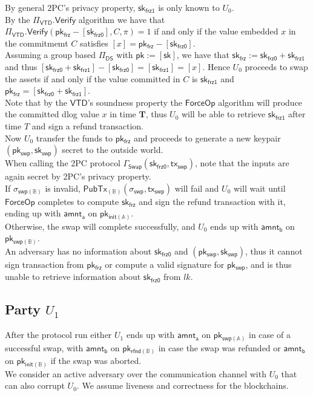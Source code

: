 \documentclass{article}      	%
\begin{document}
By general 2PC's privacy property, $\mathsf{sk_{frz1}}$ is only known to $U_0$. \\
By the $\Pi_{\mathsf{VTD}}.\mathsf{Verify}$ algorithm we have that $\Pi_{\mathsf{VTD}}.\mathsf{Verify}(\mathsf{pk_{frz}} - [\mathsf{sk_{frz0}}], C, \pi) = 1$ if and only if the value embedded $x$ in the commitmemt $C$ satisfies $[x] =  \mathsf{pk_{frz}} - [\mathsf{sk_{frz0}}]$. \\
Assuming a group based $\Pi_{\mathsf{DS}}$ with $\mathsf{pk} := [\mathsf{sk}]$, we have that $\mathsf{sk_{frz}} := \mathsf{sk_{frz0}} + \mathsf{sk_{frz1}}$ and thus $[\mathsf{sk_{frz0}} + \mathsf{sk_{frz1}}] - [\mathsf{sk_{frz0}}] = [\mathsf{sk_{frz1}}] = [x] $. Hence $U_0$ proceeds to swap the assets if and only if the value committed in $C$ is $\mathsf{sk_{frz1}}$ and $\mathsf{pk_{frz}} = [\mathsf{sk_{frz0}} + \mathsf{sk_{frz1}}]$.   \\
Note that by the $\mathsf{VTD}$'s soundness property the $\mathsf{ForceOp}$ algorithm will produce the committed dlog value $x$ in time $\textbf{T}$, thus $U_0$ will be able to retrieve  $\mathsf{sk_{frz1}}$ after time $T$ and sign a refund transaction. \\
Now $U_0$ transfer the funds to $\mathsf{pk_{frz}}$ and proceeds to generate a new keypair $(\mathsf{pk_{swp}}, \mathsf{sk_{swp}})$ secret to the outside world. \\
When calling the 2PC protocol $\Gamma_{\mathsf{Swap}}(\mathsf{sk_{frz0}}, \mathsf{tx_{swp}})$, note that the inputs are again secret by 2PC's privacy property. \\
If $\sigma_{\mathsf{swp(\mathbb{B})}}$ is invalid, $\mathsf{PubTx}_{(\mathbb{B})}(\sigma_{\mathsf{swp}}, \mathsf{tx_{swp}})$ will fail and $U_0$ will wait until $\mathsf{ForceOp}$ completes to compute $\mathsf{sk_{frz}}$ and sign the refund transaction with it, ending up with $\mathsf{amnt_a}$ on $\mathsf{pk_{init(\mathbb{A})}}$. \\
Otherwise, the swap will complete successfully, and $U_0$ ends up with $\mathsf{amnt_b}$ on $\mathsf{pk_{swp(\mathbb{B})}}$. \\
An adversary has no information about $\mathsf{sk_{frz0}}$ and $(\mathsf{pk_{swp}}, \mathsf{sk_{swp}})$, thus it cannot sign transaction from $\mathsf{pk_{frz}}$ or compute a valid signature for $\mathsf{pk_{swp}}$, and is thus unable to retrieve information about $\mathsf{sk_{frz0}}$ from $lk$.\\

\subsection{Party $U_1$}
After the protocol run either $U_1$ ends up with $\mathsf{amnt_a}$ on $\mathsf{pk_{swp(\mathbb{A})}}$ in case of a successful swap, with $\mathsf{amnt_b}$ on $\mathsf{pk_{rfnd(\mathbb{B})}}$ in case the swap was refunded or $\mathsf{amnt_b}$ on $\mathsf{pk_{init(\mathbb{B})}}$ if the swap was aborted. \\
We consider an active adversary over the communication channel with $U_0$ that can also corrupt $U_0$. We assume liveness and correctness for the blockchains.\\
\end{document}
